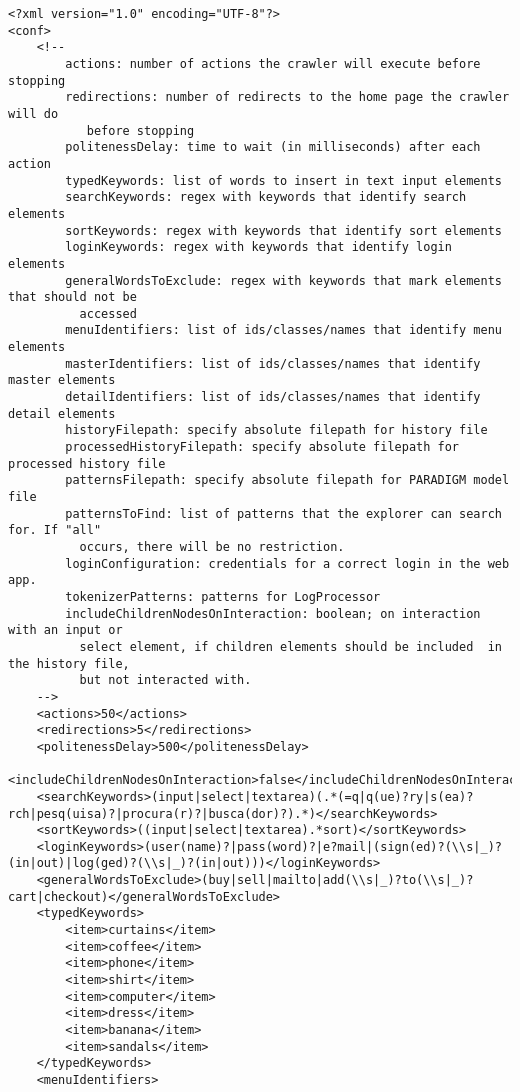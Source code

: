 \begin{lstlisting}
<?xml version="1.0" encoding="UTF-8"?>
<conf>
	<!-- 
	    actions: number of actions the crawler will execute before stopping
	    redirections: number of redirects to the home page the crawler will do 
	       before stopping
	    politenessDelay: time to wait (in milliseconds) after each action
	    typedKeywords: list of words to insert in text input elements
		searchKeywords: regex with keywords that identify search elements
		sortKeywords: regex with keywords that identify sort elements
		loginKeywords: regex with keywords that identify login elements
		generalWordsToExclude: regex with keywords that mark elements that should not be 
		  accessed
		menuIdentifiers: list of ids/classes/names that identify menu elements
		masterIdentifiers: list of ids/classes/names that identify master elements 
		detailIdentifiers: list of ids/classes/names that identify detail elements 
		historyFilepath: specify absolute filepath for history file
		processedHistoryFilepath: specify absolute filepath for processed history file
		patternsFilepath: specify absolute filepath for PARADIGM model file
		patternsToFind: list of patterns that the explorer can search for. If "all" 
		  occurs, there will be no restriction.
		loginConfiguration: credentials for a correct login in the web app.
		tokenizerPatterns: patterns for LogProcessor
		includeChildrenNodesOnInteraction: boolean; on interaction with an input or 
		  select element, if children elements should be included  in the history file, 
		  but not interacted with.
	-->
	<actions>50</actions>
	<redirections>5</redirections>
	<politenessDelay>500</politenessDelay>
	<includeChildrenNodesOnInteraction>false</includeChildrenNodesOnInteraction>
	<searchKeywords>(input|select|textarea)(.*(=q|q(ue)?ry|s(ea)?rch|pesq(uisa)?|procura(r)?|busca(dor)?).*)</searchKeywords>
	<sortKeywords>((input|select|textarea).*sort)</sortKeywords>
	<loginKeywords>(user(name)?|pass(word)?|e?mail|(sign(ed)?(\\s|_)?(in|out)|log(ged)?(\\s|_)?(in|out)))</loginKeywords>
	<generalWordsToExclude>(buy|sell|mailto|add(\\s|_)?to(\\s|_)?cart|checkout)</generalWordsToExclude>
	<typedKeywords>
        <item>curtains</item>
        <item>coffee</item>
        <item>phone</item>
        <item>shirt</item>
        <item>computer</item>
        <item>dress</item>
        <item>banana</item>
        <item>sandals</item>
    </typedKeywords>
	<menuIdentifiers>

\end{lstlisting}
